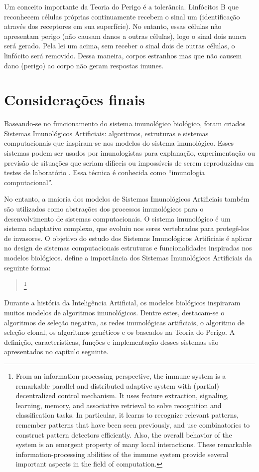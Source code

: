 Um conceito importante da Teoria do Perigo é a tolerância. Linfócitos B que reconhecem células próprias continuamente recebem o sinal um (identificação através dos receptores em sua superfície). No entanto, essas células não apresentam perigo (não causam danos a outras células), logo o sinal dois nunca será gerado. Pela lei um acima, sem receber o sinal dois de outras células, o linfócito será removido. Dessa maneira, corpos estranhos mas que não causem dano (perigo) ao corpo não geram respostas imunes.

\section{Considerações finais}

Baseando-se no funcionamento do sistema imunológico biológico, foram criados Sistemas Imunológicos Artificiais: algoritmos, estruturas e sistemas computacionais que inspiram-se nos modelos do sistema imunológico. Esses sistemas podem ser usados por imunologistas para explanação, experimentação ou previsão de situações que seriam difíceis ou impossíveis de serem reproduzidas em testes de laboratório \cite{Garrett2005}. Essa técnica é conhecida como ``imunologia computacional''.

No entanto, a maioria dos modelos de Sistemas Imunológicos Artificiais também são utilizados como abstrações dos processos imunológicos para o desenvolvimento de sistemas computacionais. O sistema imunológico é um sistema adaptativo complexo, que evoluiu nos seres vertebrados para protegê-los de invasores. O objetivo do estudo dos Sistemas Imunológicos Artificiais é aplicar no design de sistemas computacionais estruturas e funcionalidades inspiradas nos modelos biológicos. \citeauthor{Dasgupta2006} define a importância dos Sistemas Imunológicos Artificiais da seguinte forma:

\begin{quote}
    \footnote{From an information-processing perspective, the immune system is a remarkable parallel and distributed adaptive system with (partial) decentralized control mechanism. It uses feature extraction, signaling, learning, memory, and associative retrieval to solve recognition and classification tasks. In particular, it learns to recognize relevant patterns, remember patterns that have been seen previously, and use combinatorics to construct pattern detectors efficiently. Also, the overall behavior of the system is an emergent property of many local interactions. These remarkable information-processing abilities of the immune system provide several important aspects in the field of computation.}
\end{quote}

Durante a história da Inteligência Artificial, os modelos biológicos inspiraram muitos modelos de algoritmos imunológicos. Dentre estes, destacam-se o algoritmos de seleção negativa, as redes imunológicas artificiais, o algoritmo de seleção clonal, os algoritmos genéticos e os baseados na Teoria do Perigo. A definição, características, funções e implementação desses sistemas são apresentados no capítulo seguinte.

